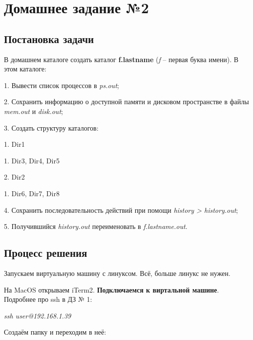 \documentclass[a4paper, 14pt]{article}
\author{}
\title{}
\date{}  %
\begin{document}
	\pagestyle{plain} %
	
	\newpage
	
	\section*{Домашнее задание №2}
	
	\subsection*{Постановка задачи}
	
	В домашнем каталоге создать каталог \textbf{f.lastname} (\textit{f} -- первая буква имени). В этом каталоге:
	
	1. Вывести список процессов в \textit{ps.out};
	
	2. Сохранить информацию о доступной памяти и дисковом пространстве в файлы \textit{mem.out} и \textit{disk.out};
	
	3. Создать структуру каталогов:
	
	\hspace{0.2cm}1. Dir1
	
	\hspace{1.2cm} 1. Dir3, Dir4, Dir5
	
	\hspace{0.2cm}2. Dir2
	
	\hspace{1.2cm} 1. Dir6, Dir7, Dir8	
	
	4. Сохранить последовательность действий при помощи \textit{history > history.out};
	
	5. Получившийся \textit{history.out} переименовать в \textit{f.lastname.out}.
	
	\subsection*{Процесс решения}
	
	Запускаем виртуальную машину с линуксом. Всё, больше линукс не нужен.
	
	\vspace{0.1cm}
	
	На MacOS открываем iTerm2. \textbf{Подключаемся к виртальной машине}. Подробнее про ssh в ДЗ № 1:
	
	\textit{ssh user@192.168.1.39}
	
	\vspace{0.2cm}
	
	 Создаём папку и переходим в неё:
	
\end{document}
